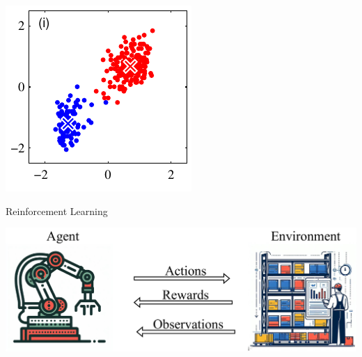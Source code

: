 \documentclass[aspectratio=169,xcolor=dvipsnames,svgnames,x11names,fleqn]{beamer}
\begin{document}
\begin{frame}
\begin{center}
    \includegraphics[scale=.4]{figures/Figure91i.pdf}
    \end{center}
 \end{frame}

 \begin{frame}{Reinforcement Learning}
   \begin{center}
     \includegraphics[width=.8\textwidth]{figures/rl_robot.drawio.pdf}\\
   \end{center}
 \end{frame}
\end{document}

